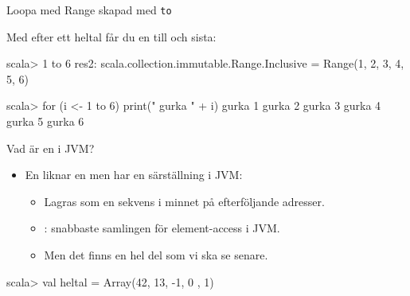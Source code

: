\begin{Slide}{Loopa med Range skapad med \texttt{to}}

Med  efter ett heltal får du en  till och  sista:
\begin{REPLnonum}
scala> 1 to 6
res2: scala.collection.immutable.Range.Inclusive = 
  Range(1, 2, 3, 4, 5, 6)

scala> for (i <- 1 to 6) print(" gurka " + i) 
 gurka 1 gurka 2 gurka 3 gurka 4 gurka 5 gurka 6
 
\end{REPLnonum}


\end{Slide}



\begin{Slide}{Vad är en  i JVM?}


\begin{itemize}
\item En  liknar en  men har en särställning i JVM:
\begin{itemize}
\item Lagras som en sekvens i minnet på efterföljande adresser.
\item {}: snabbaste samlingen för element-access i JVM.
\item Men det finns en hel del  som vi ska se senare.
\end{itemize}

\end{itemize}

\begin{REPLnonum}
scala> val heltal = Array(42, 13, -1, 0 , 1)
\end{REPLnonum}

\end{Slide}

